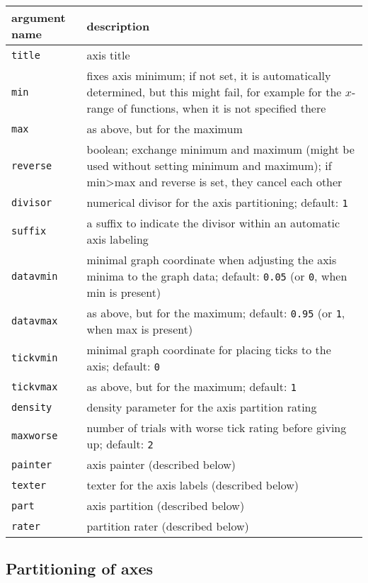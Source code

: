 \medskip
\begin{tabularx}{\linewidth}{l>{\raggedright\arraybackslash}X}
argument name&description\\
\hline
\texttt{title}&axis title\\
\texttt{min}&fixes axis minimum; if not set, it is automatically determined, but this might fail, for example for the $x$-range of functions, when it is not specified there\\
\texttt{max}&as above, but for the maximum\\
\texttt{reverse}&boolean; exchange minimum and maximum (might be used without setting minimum and maximum); if min>max and reverse is set, they cancel each other\\
\texttt{divisor}&numerical divisor for the axis partitioning; default: \texttt{1}\\
\texttt{suffix}&a suffix to indicate the divisor within an automatic axis labeling\\
\texttt{datavmin}&minimal graph coordinate when adjusting the axis minima to the graph data; default: \texttt{0.05} (or \texttt{0}, when min is present)\\
\texttt{datavmax}&as above, but for the maximum; default: \texttt{0.95} (or \texttt{1}, when max is present)\\
\texttt{tickvmin}&minimal graph coordinate for placing ticks to the axis; default: \texttt{0}\\
\texttt{tickvmax}&as above, but for the maximum; default: \texttt{1}\\
\texttt{density}&density parameter for the axis partition rating\\
\texttt{maxworse}&number of trials with worse tick rating before giving up; default: \texttt{2}\\
\texttt{painter}&axis painter (described below)\\
\texttt{texter}&texter for the axis labels (described below)\\
\texttt{part}&axis partition (described below)\\
\texttt{rater}&partition rater (described below)\\
\end{tabularx}
\medskip

\subsection{Partitioning of axes}

